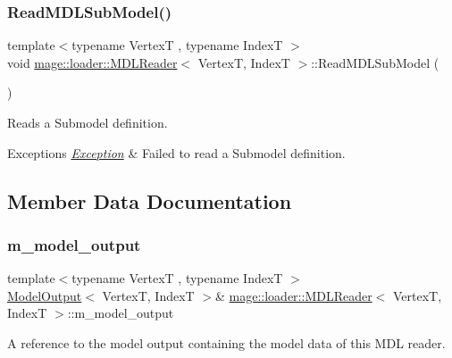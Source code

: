 \subsubsection{\texorpdfstring{Read\+M\+D\+L\+Sub\+Model()}{ReadMDLSubModel()}}
{\footnotesize\ttfamily template$<$typename VertexT , typename IndexT $>$ \\
void \hyperlink{classmage_1_1loader_1_1_m_d_l_reader}{mage\+::loader\+::\+M\+D\+L\+Reader}$<$ VertexT, IndexT $>$\+::Read\+M\+D\+L\+Sub\+Model (\begin{DoxyParamCaption}{ }\end{DoxyParamCaption})\hspace{0.3cm}{\ttfamily [private]}}

Reads a Submodel definition.


\begin{DoxyExceptions}{Exceptions}
{\em \hyperlink{classmage_1_1_exception}{Exception}} & Failed to read a Submodel definition. \\
\hline
\end{DoxyExceptions}


\subsection{Member Data Documentation}
\hypertarget{classmage_1_1loader_1_1_m_d_l_reader_a597a8fc465868965899249b5c94b8a1d}{}\label{classmage_1_1loader_1_1_m_d_l_reader_a597a8fc465868965899249b5c94b8a1d} 
\subsubsection{\texorpdfstring{m\+\_\+model\+\_\+output}{m\_model\_output}}
{\footnotesize\ttfamily template$<$typename VertexT , typename IndexT $>$ \\
\hyperlink{structmage_1_1_model_output}{Model\+Output}$<$ VertexT, IndexT $>$\& \hyperlink{classmage_1_1loader_1_1_m_d_l_reader}{mage\+::loader\+::\+M\+D\+L\+Reader}$<$ VertexT, IndexT $>$\+::m\+\_\+model\+\_\+output\hspace{0.3cm}{\ttfamily [private]}}

A reference to the model output containing the model data of this M\+DL reader. 